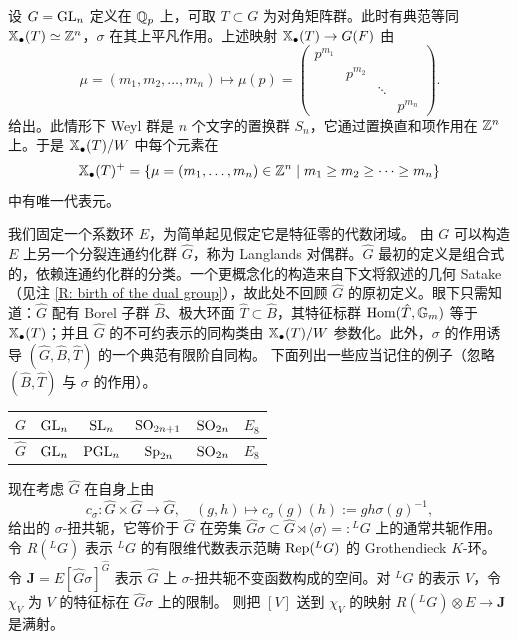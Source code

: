 \begin{ex}\label{coweightGLn}
设 $G={\operatorname{GL}}_n$ 定义在 ${\mathbb Q}_p$ 上，可取 $T\subset G$ 为对角矩阵群。此时有典范等同 $\mathbb{X}_\bullet(T)\simeq {\mathbb Z}^n$，$\sigma$ 在其上平凡作用。上述映射 $\mathbb{X}_\bullet(T)\to G(F)$ 由
\[\mu=(m_1,m_2,\ldots,m_n)\mapsto \mu(p)=\begin{pmatrix}p^{m_1}&&&\\&p^{m_2}&&\\ &&\ddots&\\ &&& p^{m_n}\end{pmatrix}.\]
给出。此情形下 Weyl 群是 $n$ 个文字的置换群 $S_n$，它通过置换直和项作用在 ${\mathbb Z}^n$ 上。于是 $\mathbb{X}_\bullet(T)/W$ 中每个元素在
$$\mathbb{X}_\bullet(T)^+=\{\mu=(m_1,\ldots,m_n)\in {\mathbb Z}^n\mid m_1\geq m_2\geq\cdots\geq m_n\}$$
中有唯一代表元。
\end{ex}

我们固定一个系数环 $E$，为简单起见假定它是特征零的代数闭域。
由 $G$ 可以构造 $E$ 上另一个分裂连通约化群 $\hat G$，称为 Langlands 对偶群。$\hat G$ 最初的定义是组合式的，依赖连通约化群的分类。一个更概念化的构造来自下文将叙述的几何 Satake（见注 \ref{R: birth of the dual group}），故此处不回顾 $\hat G$ 的原初定义。眼下只需知道：$\hat G$ 配有 Borel 子群 $\hat B$、极大环面 $\hat T\subset \hat B$，其特征标群 ${\operatorname{Hom}}(\hat T,{\mathbb G}_m)$ 等于 $\mathbb{X}_\bullet(T)$；并且 $\hat G$ 的不可约表示的同构类由 $\mathbb{X}_\bullet(T)/W$ 参数化。此外，$\sigma$ 的作用诱导 $(\hat G,\hat B, \hat T)$ 的一个典范有限阶自同构。
下面列出一些应当记住的例子（忽略 $(\hat B,\hat T)$ 与 $\sigma$ 的作用）。

\medskip

\begin{center}
\begin{tabular}{| c | c | c | c | c | c |}
\hline 
$G$ & ${\operatorname{GL}}_n$ & $\operatorname{SL}_n$ & $\operatorname{SO}_{2n+1}$ & $\operatorname{SO}_{2n}$ & $E_8$  \\ \hline 
$\hat G$ & ${\operatorname{GL}}_n$ & $\operatorname{PGL}_{n}$ & $\operatorname{Sp}_{2n}$ & $\operatorname{SO}_{2n}$ & $E_8$ \\ \hline 
\end{tabular}
\end{center}

\medskip


现在考虑 $\hat G$ 在自身上由
\begin{equation}
\label{E:twist conj}
c_\sigma:\hat G\times \hat G\to\hat G, \quad (g,h)\mapsto c_\sigma(g)(h):=gh\sigma(g)^{-1},
\end{equation}
给出的 $\sigma$-扭共轭，它等价于 $\hat G$ 在旁集 $\hat G\sigma\subset \hat G\rtimes\langle\sigma\rangle=:{^L}G$ 上的通常共轭作用。令 $R({^L}G)$ 表示 ${^L}G$ 的有限维代数表示范畴 $\operatorname{Rep}({^L}G)$ 的 Grothendieck $K$-环。
令 $\mathbf J= E[\hat G\sigma]^{\hat G}$ 表示 $\hat G$ 上 $\sigma$-扭共轭不变函数构成的空间。对 ${^L}G$ 的表示 $V$，令 $\chi_V$ 为 $V$ 的特征标在 $\hat G\sigma$ 上的限制。
则把 $[V]$ 送到 $\chi_V$ 的映射 $R({^L}G)\otimes E\to \mathbf J$ 是满射。

